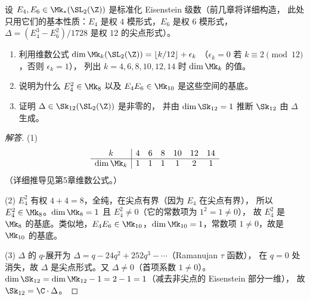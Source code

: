 \begin{exercise}
\label{ex:ch1-modular-form-graded-ring}
设 $E_4, E_6 \in \Mk_*(\SL_2(\Z))$ 是标准化 Eisenstein 级数（前几章将详细构造，
此处只用它们的基本性质：$E_4$ 是权 $4$ 模形式，$E_6$ 是权 $6$ 模形式，$\Delta = (E_4^3 - E_6^2)/1728$ 是权 $12$ 的尖点形式）。
\begin{enumerate}
  \item[(1)] 利用维数公式 $\dim\Mk_k(\SL_2(\Z)) = \lfloor k/12\rfloor + \epsilon_k$
    （$\epsilon_k = 0$ 若 $k \equiv 2 \pmod{12}$，否则 $\epsilon_k = 1$），
    列出 $k = 4, 6, 8, 10, 12, 14$ 时 $\dim\Mk_k$ 的值。
  \item[(2)] 说明为什么 $E_4^2 \in \Mk_8$ 以及 $E_4 E_6 \in \Mk_{10}$ 是这些空间的基底。
  \item[(3)] 证明 $\Delta \in \Sk_{12}(\SL_2(\Z))$ 是非零的，
    并由 $\dim\Sk_{12} = 1$ 推断 $\Sk_{12}$ 由 $\Delta$ 生成。
\end{enumerate}
\end{exercise}

\begin{proof}[解答]
(1)
\[
\begin{array}{c|cccccc}
k & 4 & 6 & 8 & 10 & 12 & 14 \\
\hline
\dim\Mk_k & 1 & 1 & 1 & 1 & 2 & 1
\end{array}
\]
（详细推导见第5章维数公式。）

(2) $E_4^2$ 有权 $4+4=8$，全纯，在尖点有界（因为 $E_4$ 在尖点有界），
所以 $E_4^2 \in \Mk_8$。$\dim\Mk_8 = 1$ 且 $E_4^2 \neq 0$（它的常数项为 $1^2 = 1 \neq 0$），
故 $E_4^2$ 是 $\Mk_8$ 的基底。类似地，$E_4 E_6 \in \Mk_{10}$，$\dim\Mk_{10}=1$，常数项 $1 \neq 0$，故是 $\Mk_{10}$ 的基底。

(3) $\Delta$ 的 $q$-展开为 $\Delta = q - 24q^2 + 252q^3 - \cdots$（Ramanujan $\tau$ 函数），
在 $q = 0$ 处消失，故 $\Delta$ 是尖点形式。又 $\Delta \neq 0$（首项系数 $1 \neq 0$）。
$\dim\Sk_{12} = \dim\Mk_{12} - 1 = 2 - 1 = 1$（减去非尖点的 Eisenstein 部分一维），
故 $\Sk_{12} = \C \cdot \Delta$。\qedhere
\end{proof}

